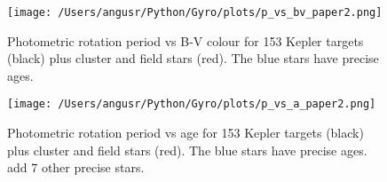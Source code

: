 \documentclass[10pt,preprint]{aastex}
\begin{document}
\begin{figure}[ht]
\begin{center}
\texttt{[image: /Users/angusr/Python/Gyro/plots/p\_vs\_bv\_paper2.png]}
\caption{Photometric rotation period vs B-V colour for 153 Kepler targets (black) plus cluster and field stars (red). The blue stars have precise ages.}
\label{fig:3d}
\end{center}
\end{figure}

\begin{figure}[ht]
\begin{center}
\texttt{[image: /Users/angusr/Python/Gyro/plots/p\_vs\_a\_paper2.png]}
\caption{Photometric rotation period vs age for 153 Kepler targets (black) plus cluster and field stars (red). The blue stars have precise ages. {\color{red} add 7 other precise stars.}}
\label{fig:p_vs_a}
\end{center}
\end{figure}



\end{document}
